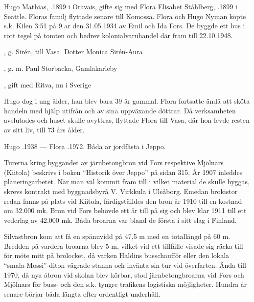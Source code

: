 Hugo Mathias, .1899 i Oravais, gifte sig med Flora Elisabet Ståhlberg, .1899 i Seattle. Floras familj flyttade senare till Komossa. Flora och Hugo Nyman köpte s.k. Kilen 3:51 på 9 ar den 31.05.1934 av Emil och Ida Fors. De byggde ett hus i rött tegel på tomten och bedrev kolonialvaruhandel där fram till 22.10.1948.
\begin{jhchildren}
  \item {}, g. Sirén, till Vasa. Dotter Monica Sirén-Aura
  \item {}, g. m. Paul Storbacka, Gamlakarleby
  \item {}, gift med Ritva, nu i Sverige
\end{jhchildren}
Hugo dog i ung ålder, han blev bara 39 år gammal. Flora fortsatte ändå att sköta handeln med hjälp utifrån och av sina uppväxande döttrar. Då verksamheten avslutades och huset skulle avyttras, flyttade Flora till Vasa, där hon levde resten av sitt liv, till 73 års ålder.

Hugo .1938  ---  Flora .1972. Båda är jordfästa i Jeppo.





Turerna kring byggandet av järnbetongbron vid Fors respektive Mjölnars (Kiitola) beskrivs i boken ``Historik över Jeppo'' på sidan 315. År 1907 inleddes planeringarbetet. När man väl kommit fram till i vilket material de skulle byggas, skrevs kontrakt med byggnadsbyrå V. Virkkula i Uleåborg. Emedan brokistor redan fanns på plats vid Kiitola, färdigställdes den bron år 1910 till en kostnad om 32.000 mk. Bron vid Fors behövde ett år till på sig och blev klar 1911 till ett vederlag av 42.000 mk. Båda broarna var bland de första i sitt slag i Finland.


Silvastbron kom att få en spännvidd på 47,5 m med en totallängd på 60 m. Bredden på vardera broarna blev 5 m, vilket vid ett tillfälle visade sig räcka till för möte mitt på brolocket, då varken Haldins busschaufför eller den lokala ``smala-Mossi''-diton vägrade stanna och invänta sin tur vid överfarten. Ända till 1970, då nya åbron vid skolan blev körbar, stod järnbetongbroarna vid Fors och Mjölnars för buss- och den s.k. tyngre trafikens logistiska möjligheter. Hundra år senare börjar båda längta efter ordentligt underhåll.






